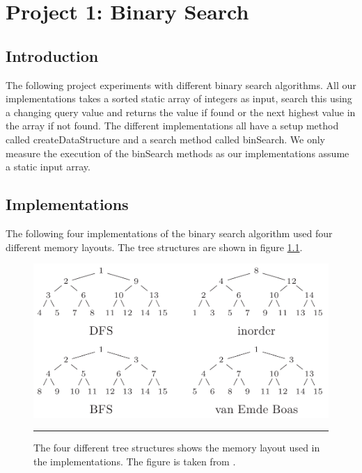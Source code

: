 
\chapter{Project 1: Binary Search} %

\label{Chapter1} %



\section{Introduction}
The following project experiments with different binary search algorithms. All our implementations takes a sorted static array of integers as input, search
this using a changing query value and returns the value if found or the next highest value in the array if not found.
The different implementations all have a setup method called createDataStructure and a search method called binSearch.
We only measure the execution of the binSearch methods as our implementations assume a static input array.

\section{Implementations}
The following four implementations of the binary search algorithm used four different memory layouts. The tree structures are shown in figure \ref{fig:memory_layouts}.

\begin{figure}[htbp]
	\centering
		\includegraphics[width=\textwidth]{./Figures/Project1/MemoryLayouts.png}
		\rule{35em}{0.5pt}
	\caption[Memory layouts]{
	The four different tree structures shows the memory layout used in the implementations. The figure is taken from \citep{binAlg}.
	}
	\label{fig:memory_layouts}
\end{figure}


